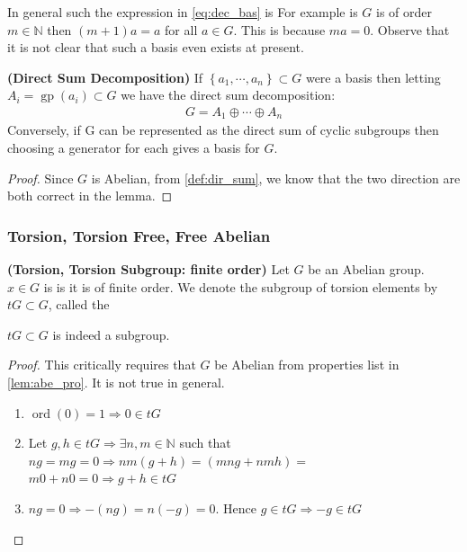 \documentclass{article}
\newcommand{\bfs}[1]{\textbf{({#1}) }}
\newcommand{\gp}{\operatorname{gp}}
\begin{document}
\begin{rema}
In general such the expression in \cref{eq:dec_bas} is  For example is $G$ is of order $m \in \mathbb{N}$ then $(m+1) a=a$ for all $a \in G$. This is because $m a=0$.
Observe that it is not clear that such a basis even exists at present.
\end{rema}
\begin{lema}{\bfs{Direct Sum Decomposition}}
If $\left\{a_{1}, \cdots, a_{n}\right\} \subset G$ were a basis then letting $A_{i}=\gp\left(a_{i}\right) \subset G$ we have the direct sum decomposition:
\begin{align*}
G=A_{1} \oplus \cdots \oplus A_{n}
\end{align*}
Conversely, if $\mathrm{G}$ can be represented as the direct sum of cyclic subgroups then choosing a generator for each gives a basis for $G$.
\end{lema}
 \begin{proof}
Since $G$ is Abelian, from \cref{def:dir_sum}, we know that the two direction are both correct in the lemma.
 \end{proof}
 \subsubsection{Torsion, Torsion Free, Free Abelian}
\begin{defa}{\bfs{Torsion, Torsion Subgroup: finite order}}
Let $G$ be an Abelian group. $x \in G$ is  is it is of finite order. We denote the subgroup of torsion elements by $tG \subset G$, called the 
\end{defa} 
\begin{lema}
 $tG \subset G$ is indeed a subgroup.
\end{lema}
\begin{proof}
This critically requires that $G$ be Abelian from properties list in \cref{lem:abe_pro}. It is not true in general.
\begin{enumerate}
    \item $\operatorname{ord}(0)=1 \Rightarrow 0 \in t G$
    \item  Let $g, h \in t G \Rightarrow \exists n, m \in \mathbb{N}$ such that $n g=m g=0 \Rightarrow n m(g+h)=(m n g+n m h)=$
$m 0+n 0=0 \Rightarrow g+h \in t G$
\item $n g=0 \Rightarrow-(n g)=n(-g)=0$. Hence $g \in t G \Rightarrow-g \in t G$
\end{enumerate}
\end{proof} 
\end{document}
